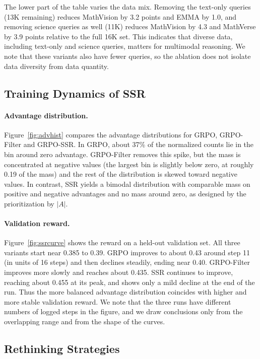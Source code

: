 \documentclass{article}
\begin{document}
The lower part of the table varies the data mix. Removing the text-only queries (13K remaining) reduces MathVision by 3.2 points and EMMA by 1.0, and removing science queries as well (11K) reduces MathVision by 4.3 and MathVerse by 3.9 points relative to the full 16K set. This indicates that diverse data, including text-only and science queries, matters for multimodal reasoning. We note that these variants also have fewer queries, so the ablation does not isolate data diversity from data quantity.

\subsection{Training Dynamics of SSR}

\paragraph{Advantage distribution.} Figure~\ref{fig:advhist} compares the advantage distributions for GRPO, GRPO-Filter and GRPO-SSR. In GRPO, about 37\% of the normalized counts lie in the bin around zero advantage. GRPO-Filter removes this spike, but the mass is concentrated at negative values (the largest bin is slightly below zero, at roughly 0.19 of the mass) and the rest of the distribution is skewed toward negative values. In contrast, SSR yields a bimodal distribution with comparable mass on positive and negative advantages and no mass around zero, as designed by the prioritization by $|A|$.

\paragraph{Validation reward.} Figure~\ref{fig:ssrcurve} shows the reward on a held-out validation set. All three variants start near 0.385 to 0.39. GRPO improves to about 0.43 around step 11 (in units of 16 steps) and then declines steadily, ending near 0.40. GRPO-Filter improves more slowly and reaches about 0.435. SSR continues to improve, reaching about 0.455 at its peak, and shows only a mild decline at the end of the run. Thus the more balanced advantage distribution coincides with higher and more stable validation reward. We note that the three runs have different numbers of logged steps in the figure, and we draw conclusions only from the overlapping range and from the shape of the curves.

\subsection{Rethinking Strategies}
\end{document}
